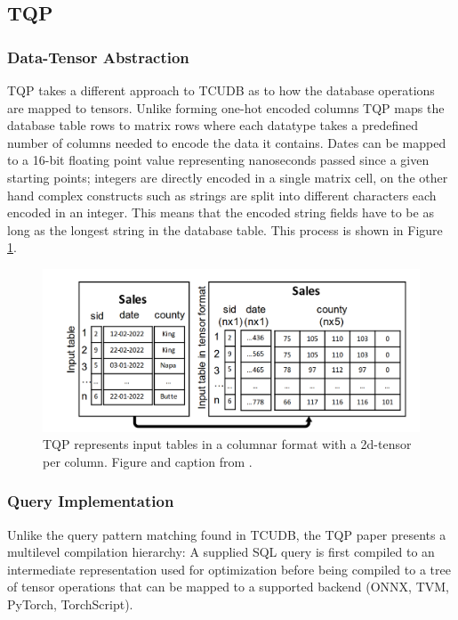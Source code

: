 \documentclass{paper}
\begin{document}
	\subsection{TQP}
	
	\subsubsection{Data-Tensor Abstraction}
	
	TQP takes a different approach to TCUDB as to how the database operations are mapped to tensors. Unlike forming one-hot encoded columns TQP maps the database table rows to matrix rows where each datatype takes a predefined number of columns needed to encode the data it contains. Dates can be mapped to a 16-bit floating point value representing nanoseconds passed since a given starting points; integers are directly encoded in a single matrix cell, on the other hand complex constructs such as strings are split into different characters each encoded in an integer. This means that the encoded string fields have to be as long as the longest string in the database table. This process is shown in Figure \ref{fig:otherpaper}.
	
	
	\begin{figure}
		\centering
		\includegraphics[width=0.9\linewidth]{otherPaper}
		\caption{TQP represents input tables in a columnar format with a 2d-tensor per column. Figure and caption from \cite{he2022query}.}
		\label{fig:otherpaper}
	\end{figure}

\subsubsection{Query Implementation}
	
	Unlike the query pattern matching found in TCUDB, the TQP paper presents a multilevel compilation hierarchy: A supplied SQL query is first compiled to an intermediate representation used for optimization before being compiled to a tree of tensor operations that can be mapped to a supported backend (ONNX, TVM, PyTorch, TorchScript).
	
\end{document}
